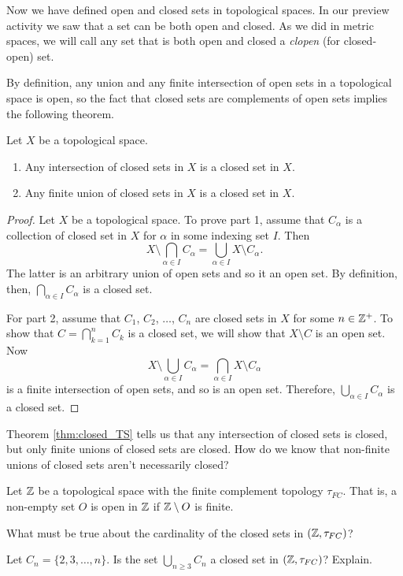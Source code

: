 
Now we have defined open and closed sets in topological spaces. In our preview activity we saw that a set can be both open and closed. As we did in metric spaces, we will call any set that is both open and closed a \emph{clopen} (for closed-open) set.

By definition, any union and any finite intersection of open sets in a topological space is open, so the fact that closed sets are complements of open sets implies the following theorem. 

\begin{theorem} \label{thm:closed_TS} Let $X$ be a topological space.
\begin{enumerate}
\item Any intersection of closed sets in $X$ is a closed set in $X$.
\item Any finite union of closed sets in $X$ is a closed set in $X$. 
\end{enumerate}
\end{theorem}

\begin{proof} Let $X$ be a topological space. To prove part 1, assume that $C_{\alpha}$ is a collection of closed set in $X$ for $\alpha$ in some indexing set $I$. Then 
\[X \setminus \bigcap_{\alpha \in I} C_{\alpha} = \bigcup_{\alpha \in I} X \setminus C_{\alpha}.\]
The latter is an arbitrary union of open sets and so it an open set. By definition, then, $\bigcap_{\alpha \in I} C_{\alpha}$ is a closed set. 

For part 2, assume that $C_1$, $C_2$, $\ldots$, $C_n$ are closed sets in $X$ for some $n \in \mathbb{Z}^+$. To show that $C = \bigcap_{k=1}^n C_k$ is a closed set, we will show that $X \setminus C$ is an open set. Now 
\[X \setminus \bigcup_{\alpha \in I} C_{\alpha} = \bigcap_{\alpha \in I} X \setminus C_{\alpha}\]
is a finite intersection of open sets, and so is an open set. Therefore, $\bigcup_{\alpha \in I} C_{\alpha} $ is a closed set. 
\end{proof}

Theorem \ref{thm:closed_TS} tells us that any intersection of closed sets is closed, but only finite unions of closed sets are closed. How do we know that non-finite unions of closed sets aren't necessarily closed?

\begin{activity} Let $\mathbb{Z}$ be a topological space with the finite complement topology $\tau_{FC}$. That is, a non-empty set $O$ is open in $\mathbb{Z}$ if $\mathbb{Z} \setminus O$ is finite. 
	\ba
	\item What must be true about the cardinality of the closed sets in $(\mathbb{Z}, \tau_{FC})$? 
	
	\item Let $C_n = \{2, 3, \ldots, n\}$. Is the set $\bigcup_{n \geq 3} C_n$ a closed set in $(\mathbb{Z}, \tau_{FC})$? Explain. 

	\ea
	
\end{activity}
	
